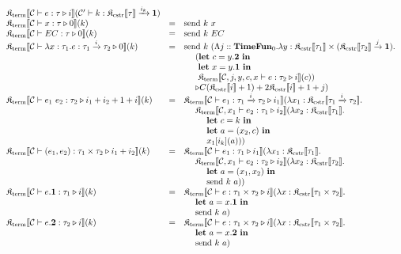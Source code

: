 \documentclass[fleqn]{article}
\begin{document}
\[
\begin{array}{lcl}
	\cpst{\jty{\mathcal{C}}{e}{\tau}{i}}{\jtyc{\mathcal{C}'}{k}{\cpsc{\tau} \xrightarrow{i_k} \mathbf{1}}} \\
	\cpst{\jty{\mathcal{C}}{x}{\tau}{0}}{k} & = & \mathrm{send}~k~x \\
	\cpst{\jty{\mathcal{C}}{EC}{\tau}{0}}{k} & = & \mathrm{send}~k~EC \\
	\cpst{\jty{\mathcal{C}}{\lambda x : \tau_1. e}{\tau_1 \xrightarrow{i} \tau_2}{0}}{k} & = & \mathrm{send}~k~(\Lambda j :: \mathbf{TimeFun}_0. \lambda y : \cpsc{\tau_1} \times (\cpsc{\tau_2} \xrightarrow{j} \mathbf{1}). \\
	& & ~~~~ (\mathbf{let}~c=y.\mathbf{2}~\mathbf{in} \\
	& & ~~~~~ \mathbf{let}~x=y.\mathbf{1}~\mathbf{in} \\
	& & ~~~~~ \cpst{\jty{\mathcal{C},j,y,c,x}{e}{\tau_2}{i}}{c}) \\
	& & ~~~~ \triangleright {C(\cpsc{i}+1)+2\cpsc{i}+1+j} ) \\
	\cpst{\jty{\mathcal{C}}{e_1~e_2}{\tau_2}{i_1+i_2+1+i}}{k} & = & \cpst{\jty{\mathcal{C}}{e_1}{\tau_1 \xrightarrow{i} \tau_2}{i_1}}{\lambda x_1 : \cpsc{\tau_1 \xrightarrow{i} \tau_2}. \\
	& & ~~~~ \cpst{\jty{\mathcal{C},x_1}{e_2}{\tau_1}{i_2}}{\lambda x_2:\cpsc{\tau_1}. \\
	& & ~~~~~~~~ \mathbf{let}~c = k~\mathbf{in} \\
	& & ~~~~~~~~ \mathbf{let}~a = (x_2,c)~\mathbf{in} \\
	& & ~~~~~~~~ x_1[i_k](a) } } \\
	\cpst{\jty{\mathcal{C}}{(e_1,e_2)}{\tau_1 \times \tau_2}{i_1+i_2}}{k} & = & \cpst{\jty{\mathcal{C}}{e_1}{\tau_1}{i_1}}{\lambda x_1 : \cpsc{\tau_1}. \\
	& & ~~~~ \cpst{\jty{\mathcal{C},x_1}{e_2}{\tau_2}{i_2}}{\lambda x_2 : \cpsc{\tau_2}. \\
	& & ~~~~~~~~ \mathbf{let}~a=(x_1,x_2)~\mathbf{in} \\
	& & ~~~~~~~~ \mathrm{send}~k~a } } \\
	\cpst{\jty{\mathcal{C}}{e.\mathbf{1}}{\tau_1}{i}}{k} & = & \cpst{\jty{\mathcal{C}}{e}{\tau_1 \times \tau_2}{i}}{\lambda x : \cpsc{\tau_1 \times \tau_2}. \\
	& & ~~~~ \mathbf{let}~a=x.\mathbf{1}~\mathbf{in} \\
	& & ~~~~ \mathrm{send}~k~a } \\
	\cpst{\jty{\mathcal{C}}{e.\mathbf{2}}{\tau_2}{i}}{k} & = & \cpst{\jty{\mathcal{C}}{e}{\tau_1 \times \tau_2}{i}}{\lambda x : \cpsc{\tau_1 \times \tau_2}. \\
	& & ~~~~ \mathbf{let}~a=x.\mathbf{2}~\mathbf{in} \\
	& & ~~~~ \mathrm{send}~k~a }
\end{array}
\]
\end{document}
